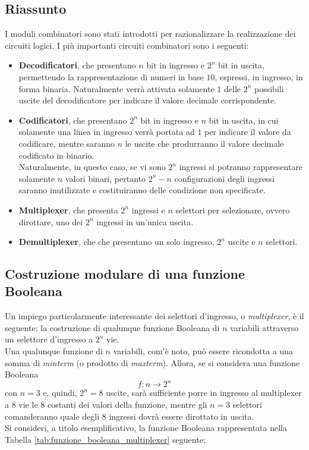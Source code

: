 \documentclass[a4paper]{extarticle}
\begin{document}
\subsection{Riassunto}
I moduli combinatori sono stati introdotti per razionalizzare la realizzazione dei circuiti logici. I più importanti circuiti combinatori sono i seguenti:
\begin{itemize}
    \item \textbf{Decodificatori}, che presentano \(n\) bit in ingresso e \(2^n\) bit in uscita, permettendo la rappresentazione di numeri in base \(10\), espressi, in ingresso, in forma binaria. Naturalmente verrà attivata solamente \(1\) delle \(2^n\) possibili uscite del decodificatore per indicare il valore decimale corrispondente.

    \item \textbf{Codificatori}, che presentano \(2^n\) bit in ingresso e \(n\) bit in uscita, in cui solamente una linea in ingresso verrà portata ad \(1\) per indicare il valore da codificare, mentre saranno \(n\) le uscite che produrranno il valore decimale codificato in binario.\\
    Naturalmente, in questo caso, se vi sono \(2^n\) ingressi si potranno rappresentare solamente \(n\) valori binari, pertanto \(2^{n} - n\) configurazioni degli ingressi saranno inutilizzate e costituiranno delle condizione non specificate.

    \item \textbf{Multiplexer}, che presenta \(2^n\) ingressi e \(n\) selettori per selezionare, ovvero dirottare, uno dei \(2^n\) ingressi in un'unica uscita.

    \item \textbf{Demultiplexer}, che che presentano un solo ingresso, \(2^n\) uscite e \(n\) selettori.
\end{itemize}

\vspace{1em}
\subsection{Costruzione modulare di una funzione Booleana}
Un impiego particolarmente interessante dei selettori d’ingresso, o \emph{multiplexer}, è il seguente: la costruzione di qualunque funzione Booleana di \(n\) variabili attraverso un selettore d’ingresso a \(2^n\) vie.\\
Una qualunque funzione di \(n\) variabili, com'è noto, può essere ricondotta a una somma di \textit{minterm} (o prodotto di \emph{maxterm}). Allora, se si considera una funzione Booleana
\[f : n \rightarrow 2^n\]
con \(n = 3\) e, quindi, \(2^n = 8\) uscite, sarà sufficiente porre in ingresso al multiplexer a \(8\) vie le \(8\) costanti dei valori della funzione, mentre gli \(n = 3\) selettori comanderanno quale degli \(8\) ingressi dovrà essere dirottato in uscita.\\
Si consideri, a titolo esemplificativo, la funzione Booleana rappresentata nella Tabella \ref{tab:funzione_booleana_multiplexer} seguente:
\end{document}

